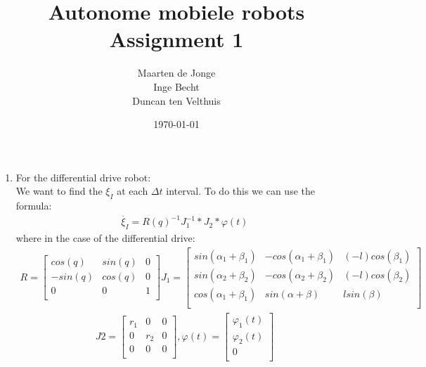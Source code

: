 \documentclass[a4paper, 20pt]{report}
\author{Maarten de Jonge \\
    Inge Becht\\
Duncan ten Velthuis}
\date{\today}
\title{Autonome mobiele robots\\ 
Assignment 1}
\begin{document}
\maketitle

\begin{enumerate}
    \item For the differential drive robot:\\
        We want to find the $\xi_I$ at each $\Delta t$ interval.
        To do this we can use the formula:
        \begin{align*}
            \dot{\xi_I} = R(q)^{-1}J_1^{-1} *J_2*\varphi(t)
        \end{align*}
        where in the case of the differential drive:
        \begin{align*}
            R = \begin{bmatrix}
                cos(q) & sin(q) & 0           \\[0.3em]
                -sin(q) & cos(q)& 0           \\[0.3em]
                0 & 0 & 1\\
            \end{bmatrix}
            J_1 =
            \begin{bmatrix}
                sin(\alpha_1 + \beta_1)  &-cos(\alpha_1 + \beta_1) & (-l)cos(\beta_1)\\
                sin(\alpha_2 + \beta_2)  &-cos(\alpha_2 + \beta_2) & (-l)cos(\beta_2)\\
                cos(\alpha_1 + \beta_1) & sin(\alpha + \beta)    &   lsin(\beta) \\
            \end{bmatrix}
        \end{align*}
        \begin{align*}
            J2 = 
            \begin{bmatrix}
                r_1 & 0 & 0 \\
                0 & r_2 & 0 \\
                0 & 0 & 0\\
            \end{bmatrix},
            \varphi(t) = 
            \begin{bmatrix}
                \varphi_1(t) \\
                \varphi_2(t )\\ 
                0\\
            \end{bmatrix}
        \end{align*}

\end{enumerate}
\end{document}
